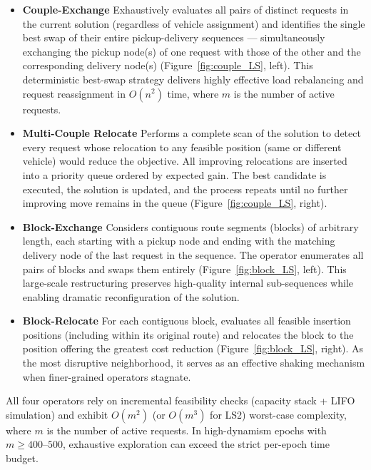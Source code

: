 \documentclass[]{interact}
\begin{document}
\begin{itemize}
    \item \textbf{Couple-Exchange}  
    Exhaustively evaluates all pairs of distinct requests in the current solution (regardless of vehicle assignment) and identifies the single best swap of their entire pickup-delivery sequences — simultaneously exchanging the pickup node(s) of one request with those of the other and the corresponding delivery node(s) (Figure~\ref{fig:couple_LS}, left). This deterministic best-swap strategy delivers highly effective load rebalancing and request reassignment in $O(n^2)$ time, where $m$ is the number of active requests.

    \item \textbf{Multi-Couple Relocate }  
    Performs a complete scan of the solution to detect every request whose relocation to any feasible position (same or different vehicle) would reduce the objective. All improving relocations are inserted into a priority queue ordered by expected gain. The best candidate is executed, the solution is updated, and the process repeats until no further improving move remains in the queue (Figure~\ref{fig:couple_LS}, right).

    \item \textbf{Block-Exchange }  
    Considers contiguous route segments (blocks) of arbitrary length, each starting with a pickup node and ending with the matching delivery node of the last request in the sequence. The operator enumerates all pairs of blocks and swaps them entirely (Figure~\ref{fig:block_LS}, left). This large-scale restructuring preserves high-quality internal sub-sequences while enabling dramatic reconfiguration of the solution.

    \item \textbf{Block-Relocate}  
    For each contiguous block, evaluates all feasible insertion positions (including within its original route) and relocates the block to the position offering the greatest cost reduction (Figure~\ref{fig:block_LS}, right). As the most disruptive neighborhood, it serves as an effective shaking mechanism when finer-grained operators stagnate.
\end{itemize}

All four operators rely on incremental feasibility checks (capacity stack + LIFO simulation) and exhibit $O(m^2)$ (or $O(m^3)$ for LS2) worst-case complexity, where $m$ is the number of active requests. In high-dynamism epochs with $m \ge 400–500$, exhaustive exploration can exceed the strict per-epoch time budget.
\end{document}
